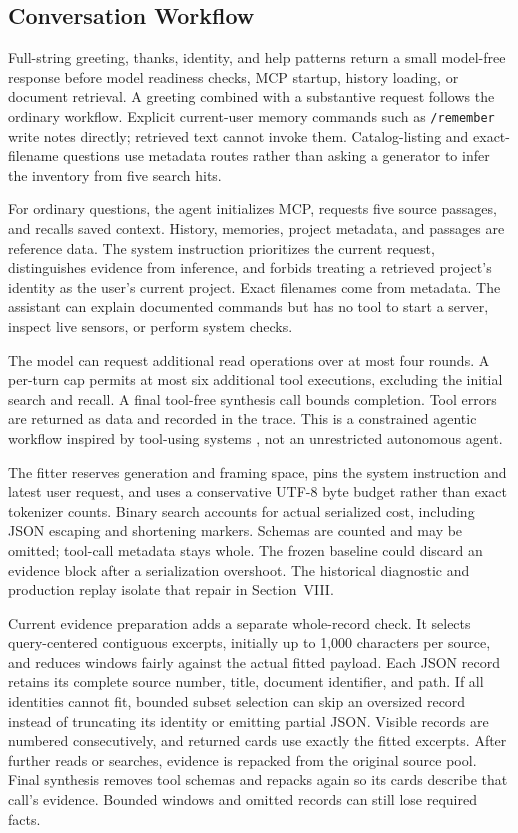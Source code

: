 \documentclass[conference,letterpaper]{IEEEtran}
\newcommand{\code}[1]{\texttt{#1}}
\begin{document}
\subsection{Conversation Workflow}
Full-string greeting, thanks, identity, and help patterns return a small model-free response before model readiness checks, MCP startup, history loading, or document retrieval. A greeting combined with a substantive request follows the ordinary workflow. Explicit current-user memory commands such as \code{/remember} write notes directly; retrieved text cannot invoke them. Catalog-listing and exact-filename questions use metadata routes rather than asking a generator to infer the inventory from five search hits.

For ordinary questions, the agent initializes MCP, requests five source passages, and recalls saved context. History, memories, project metadata, and passages are reference data. The system instruction prioritizes the current request, distinguishes evidence from inference, and forbids treating a retrieved project's identity as the user's current project. Exact filenames come from metadata. The assistant can explain documented commands but has no tool to start a server, inspect live sensors, or perform system checks.

The model can request additional read operations over at most four rounds. A per-turn cap permits at most six additional tool executions, excluding the initial search and recall. A final tool-free synthesis call bounds completion. Tool errors are returned as data and recorded in the trace. This is a constrained agentic workflow inspired by tool-using systems \cite{react}, not an unrestricted autonomous agent.

The fitter reserves generation and framing space, pins the system instruction and latest user request, and uses a conservative UTF-8 byte budget rather than exact tokenizer counts. Binary search accounts for actual serialized cost, including JSON escaping and shortening markers. Schemas are counted and may be omitted; tool-call metadata stays whole. The frozen baseline could discard an evidence block after a serialization overshoot. The historical diagnostic and production replay isolate that repair in Section~VIII.

Current evidence preparation adds a separate whole-record check. It selects query-centered contiguous excerpts, initially up to 1,000 characters per source, and reduces windows fairly against the actual fitted payload. Each JSON record retains its complete source number, title, document identifier, and path. If all identities cannot fit, bounded subset selection can skip an oversized record instead of truncating its identity or emitting partial JSON. Visible records are numbered consecutively, and returned cards use exactly the fitted excerpts. After further reads or searches, evidence is repacked from the original source pool. Final synthesis removes tool schemas and repacks again so its cards describe that call's evidence. Bounded windows and omitted records can still lose required facts.
\end{document}
